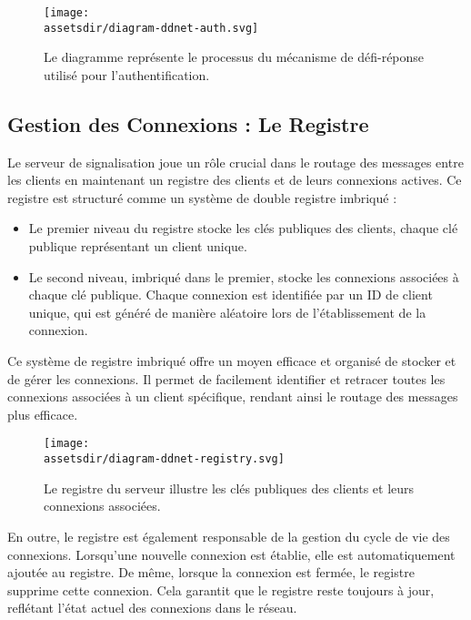 \begin{figure}[H]
  \begin{center}
    \texttt{[image: \\assetsdir/diagram-ddnet-auth.svg]} %
  \end{center}
  \caption[Mécanisme de Défi-Réponse]{Le diagramme représente le processus du mécanisme de défi-réponse utilisé pour l'authentification.}
\end{figure}

\subsection{Gestion des Connexions : Le Registre}

Le serveur de signalisation joue un rôle crucial dans le routage des messages entre les clients en maintenant un registre des clients et de leurs connexions actives. Ce registre est structuré comme un système de double registre imbriqué :

\begin{itemize}
  \item Le premier niveau du registre stocke les clés publiques des clients, chaque clé publique représentant un client unique.
  \item Le second niveau, imbriqué dans le premier, stocke les connexions associées à chaque clé publique. Chaque connexion est identifiée par un ID de client unique, qui est généré de manière aléatoire lors de l'établissement de la connexion.
\end{itemize}

Ce système de registre imbriqué offre un moyen efficace et organisé de stocker et de gérer les connexions. Il permet de facilement identifier et retracer toutes les connexions associées à un client spécifique, rendant ainsi le routage des messages plus efficace.

\begin{figure}[H]
  \begin{center}
    \texttt{[image: \\assetsdir/diagram-ddnet-registry.svg]}
  \end{center}
  \caption[Registre et Connexions]{Le registre du serveur illustre les clés publiques des clients et leurs connexions associées.}
\end{figure}

En outre, le registre est également responsable de la gestion du cycle de vie des connexions. Lorsqu'une nouvelle connexion est établie, elle est automatiquement ajoutée au registre. De même, lorsque la connexion est fermée, le registre supprime cette connexion. Cela garantit que le registre reste toujours à jour, reflétant l'état actuel des connexions dans le réseau.

